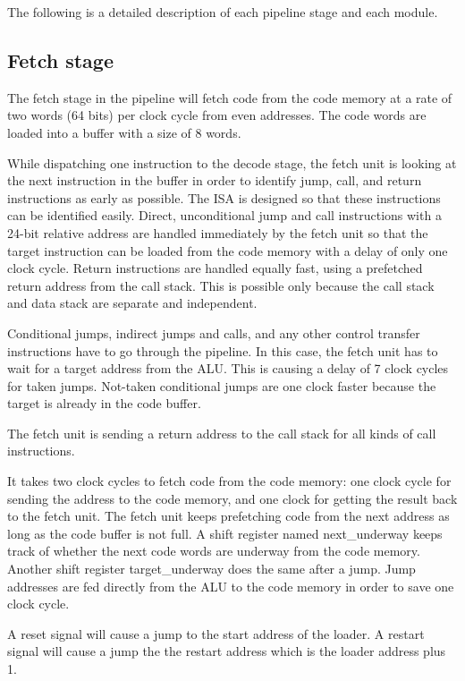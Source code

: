 \documentclass[11pt,a4paper,oneside,openright]{report}
\newcommand{\vv}{ \vspace{2mm} }   %
\begin{document}
The following is a detailed description of each pipeline stage and each module.
\vv

\subsection{Fetch stage}
The fetch stage in the pipeline will fetch code from the code memory at a rate of two words (64 bits) per clock cycle from even addresses. The code words are loaded into a buffer with a size of 8 words.
\vv

While dispatching one instruction to the decode stage, the fetch unit is looking at the next instruction in the buffer in order to identify jump, call, and return instructions as early as possible. The ISA is designed so that these instructions can be identified easily. Direct, unconditional jump and call instructions with a 24-bit relative address are handled immediately by the fetch unit so that the target instruction can be loaded from the code memory with a delay of only one clock cycle. Return instructions are handled equally fast, using a prefetched return address from the call stack. This is possible only because the call stack and data stack are separate and independent.
\vv

Conditional jumps, indirect jumps and calls, and any other control transfer instructions have to go through the pipeline. In this case, the fetch unit has to wait for a target address from the ALU. This is causing a delay of 7 clock cycles for taken jumps. Not-taken conditional jumps are one clock faster because the target is already in the code buffer.
\vv

The fetch unit is sending a return address to the call stack for all kinds of call instructions.
\vv

It takes two clock cycles to fetch code from the code memory: one clock cycle for sending the address to the code memory, and one clock for getting the result back to the fetch unit. The fetch unit keeps prefetching code from the next address as long as the code buffer is not full. A shift register named next\_underway keeps track of whether the next code words are underway from the code memory. Another shift register target\_underway does the same after a jump. Jump addresses are fed directly from the ALU to the code memory in order to save one clock cycle.
\vv

A reset signal will cause a jump to the start address of the loader. A restart signal will cause a jump the the restart address which is the loader address plus 1.
\vv
\end{document}
